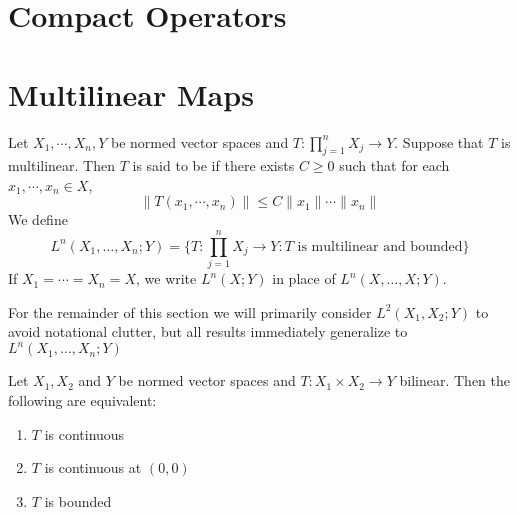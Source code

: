 \documentclass{book}
\begin{document}
	
	
	
	






\newpage
\section{Compact Operators}


\begin{defn}

\end{defn}























	\newpage
	\section{Multilinear Maps}	
	
	\begin{defn} 
		Let $X_1, \cdots, X_n, Y$ be normed vector spaces and $T : \prod\limits_{j=1}^n X_j \rightarrow Y$. Suppose that $T$ is multilinear. Then $T$ is said to be  if there exists $C \geq 0$ such that for each $x_1, \cdots, x_n \in X$, $$\|T(x_1, \cdots, x_n)\| \leq C \|x_1\| \cdots \|x_n\|$$
		We define $$L^n (X_1, \dots, X_n; Y) = \bigg\{T : \prod\limits_{j=1}^n X_j \rightarrow Y: T \text{ is multilinear and bounded}\bigg \}$$ 
		If $X_1 = \cdots = X_n = X$, we write $L^n(X;Y)$ in place of $L^n (X, \dots, X; Y) $. 
	\end{defn}
	
	\begin{note}
	For the remainder of this section we will primarily consider $L^2(X_1, X_2; Y)$ to avoid notational clutter, but all results immediately generalize to $L^n(X_1, \ldots, X_n;Y)$
	\end{note}
	
	\begin{ex} 
	Let $X_1, X_2$ and $Y$ be normed vector spaces and $T: X_1 \times X_2 \rightarrow Y$ bilinear. Then the following are equivalent:
	\begin{enumerate}
			\item $T$ is continuous
			\item $T$ is continuous at $(0,0)$
			\item $T$ is bounded
		\end{enumerate}
	\end{ex}
	
\end{document}
